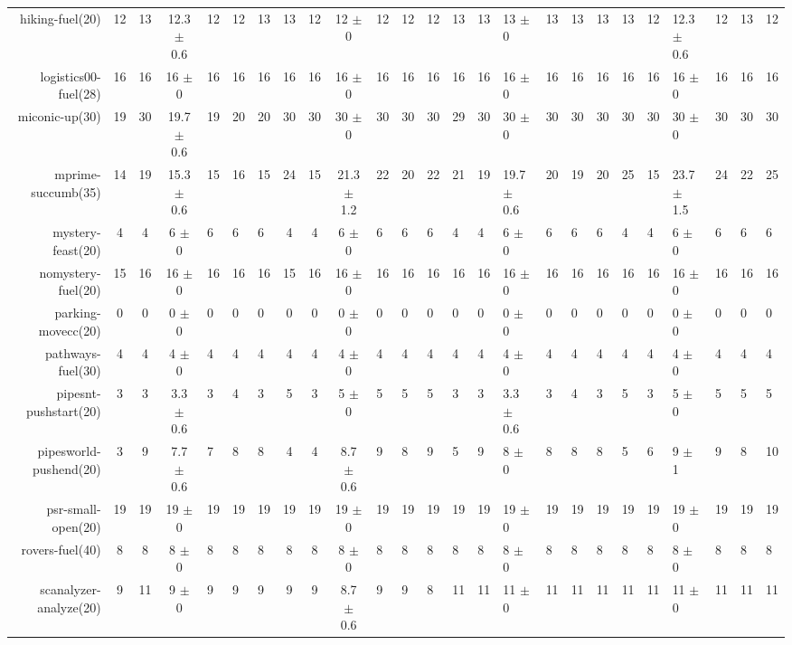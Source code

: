 \begin{center}
\begin{tabular}{|rcccHHH|cccHHHHHHHHHHHHHHH|}
hiking-fuel(20) & 12 & 13 & 12.3 $\pm$ 0.6 & 12 & 12 & 13 & 13 & 12 & 12 $\pm$ 0 & 12 & 12 & 12 & 13 & 13 & 13 $\pm$ 0 & 13 & 13 & 13 & 13 & 12 & 12.3 $\pm$ 0.6 & 12 & 13 & 12\\
logistics00-fuel(28) & 16 & 16 & 16 $\pm$ 0 & 16 & 16 & 16 & 16 & 16 & 16 $\pm$ 0 & 16 & 16 & 16 & 16 & 16 & 16 $\pm$ 0 & 16 & 16 & 16 & 16 & 16 & 16 $\pm$ 0 & 16 & 16 & 16\\
miconic-up(30) & 19 & 30 & 19.7 $\pm$ 0.6 & 19 & 20 & 20 & 30 & 30 & 30 $\pm$ 0 & 30 & 30 & 30 & 29 & 30 & 30 $\pm$ 0 & 30 & 30 & 30 & 30 & 30 & 30 $\pm$ 0 & 30 & 30 & 30\\
mprime-succumb(35) & 14 & 19 & 15.3 $\pm$ 0.6 & 15 & 16 & 15 & 24 & 15 & 21.3 $\pm$ 1.2 & 22 & 20 & 22 & 21 & 19 & 19.7 $\pm$ 0.6 & 20 & 19 & 20 & 25 & 15 & 23.7 $\pm$ 1.5 & 24 & 22 & 25\\
mystery-feast(20) & 4 & 4 & 6 $\pm$ 0 & 6 & 6 & 6 & 4 & 4 & 6 $\pm$ 0 & 6 & 6 & 6 & 4 & 4 & 6 $\pm$ 0 & 6 & 6 & 6 & 4 & 4 & 6 $\pm$ 0 & 6 & 6 & 6\\
nomystery-fuel(20) & 15 & 16 & 16 $\pm$ 0 & 16 & 16 & 16 & 15 & 16 & 16 $\pm$ 0 & 16 & 16 & 16 & 16 & 16 & 16 $\pm$ 0 & 16 & 16 & 16 & 16 & 16 & 16 $\pm$ 0 & 16 & 16 & 16\\
parking-movecc(20) & 0 & 0 & 0 $\pm$ 0 & 0 & 0 & 0 & 0 & 0 & 0 $\pm$ 0 & 0 & 0 & 0 & 0 & 0 & 0 $\pm$ 0 & 0 & 0 & 0 & 0 & 0 & 0 $\pm$ 0 & 0 & 0 & 0\\
pathways-fuel(30) & 4 & 4 & 4 $\pm$ 0 & 4 & 4 & 4 & 4 & 4 & 4 $\pm$ 0 & 4 & 4 & 4 & 4 & 4 & 4 $\pm$ 0 & 4 & 4 & 4 & 4 & 4 & 4 $\pm$ 0 & 4 & 4 & 4\\
pipesnt-pushstart(20) & 3 & 3 & 3.3 $\pm$ 0.6 & 3 & 4 & 3 & 5 & 3 & 5 $\pm$ 0 & 5 & 5 & 5 & 3 & 3 & 3.3 $\pm$ 0.6 & 3 & 4 & 3 & 5 & 3 & 5 $\pm$ 0 & 5 & 5 & 5\\
pipesworld-pushend(20) & 3 & 9 & 7.7 $\pm$ 0.6 & 7 & 8 & 8 & 4 & 4 & 8.7 $\pm$ 0.6 & 9 & 8 & 9 & 5 & 9 & 8 $\pm$ 0 & 8 & 8 & 8 & 5 & 6 & 9 $\pm$ 1 & 9 & 8 & 10\\
psr-small-open(20) & 19 & 19 & 19 $\pm$ 0 & 19 & 19 & 19 & 19 & 19 & 19 $\pm$ 0 & 19 & 19 & 19 & 19 & 19 & 19 $\pm$ 0 & 19 & 19 & 19 & 19 & 19 & 19 $\pm$ 0 & 19 & 19 & 19\\
rovers-fuel(40) & 8 & 8 & 8 $\pm$ 0 & 8 & 8 & 8 & 8 & 8 & 8 $\pm$ 0 & 8 & 8 & 8 & 8 & 8 & 8 $\pm$ 0 & 8 & 8 & 8 & 8 & 8 & 8 $\pm$ 0 & 8 & 8 & 8\\
scanalyzer-analyze(20) & 9 & 11 & 9 $\pm$ 0 & 9 & 9 & 9 & 9 & 9 & 8.7 $\pm$ 0.6 & 9 & 9 & 8 & 11 & 11 & 11 $\pm$ 0 & 11 & 11 & 11 & 11 & 11 & 11 $\pm$ 0 & 11 & 11 & 11\\

\end{tabular}
\end{center}
